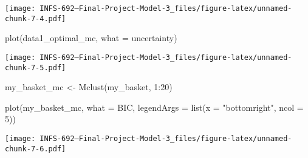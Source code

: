 \documentclass[
]{article}
\newenvironment{Shaded}{\begin{snugshade}}{\end{snugshade}}
\newcommand{\AttributeTok}[1]{\textcolor[rgb]{0.77,0.63,0.00}{#1}}
\newcommand{\DecValTok}[1]{\textcolor[rgb]{0.00,0.00,0.81}{#1}}
\newcommand{\FunctionTok}[1]{\textcolor[rgb]{0.00,0.00,0.00}{#1}}
\newcommand{\NormalTok}[1]{#1}
\newcommand{\OtherTok}[1]{\textcolor[rgb]{0.56,0.35,0.01}{#1}}
\newcommand{\SpecialCharTok}[1]{\textcolor[rgb]{0.00,0.00,0.00}{#1}}
\newcommand{\StringTok}[1]{\textcolor[rgb]{0.31,0.60,0.02}{#1}}
\begin{document}
\texttt{[image: INFS-692---Final-Project-Model-3\_files/figure-latex/unnamed-chunk-7-4.pdf]}

\begin{Shaded}
\begin{Highlighting}[]
\FunctionTok{plot}\NormalTok{(data1\_optimal\_mc, }\AttributeTok{what =} \StringTok{\textquotesingle{}uncertainty\textquotesingle{}}\NormalTok{)}
\end{Highlighting}
\end{Shaded}

\texttt{[image: INFS-692---Final-Project-Model-3\_files/figure-latex/unnamed-chunk-7-5.pdf]}

\begin{Shaded}
\begin{Highlighting}[]
\NormalTok{my\_basket\_mc }\OtherTok{\textless{}{-}} \FunctionTok{Mclust}\NormalTok{(my\_basket, }\DecValTok{1}\SpecialCharTok{:}\DecValTok{20}\NormalTok{)}


\FunctionTok{plot}\NormalTok{(my\_basket\_mc, }\AttributeTok{what =} \StringTok{\textquotesingle{}BIC\textquotesingle{}}\NormalTok{, }
     \AttributeTok{legendArgs =} \FunctionTok{list}\NormalTok{(}\AttributeTok{x =} \StringTok{"bottomright"}\NormalTok{, }\AttributeTok{ncol =} \DecValTok{5}\NormalTok{))}
\end{Highlighting}
\end{Shaded}

\texttt{[image: INFS-692---Final-Project-Model-3\_files/figure-latex/unnamed-chunk-7-6.pdf]}

\begin{Shaded}
\end{Shaded}
\end{document}
